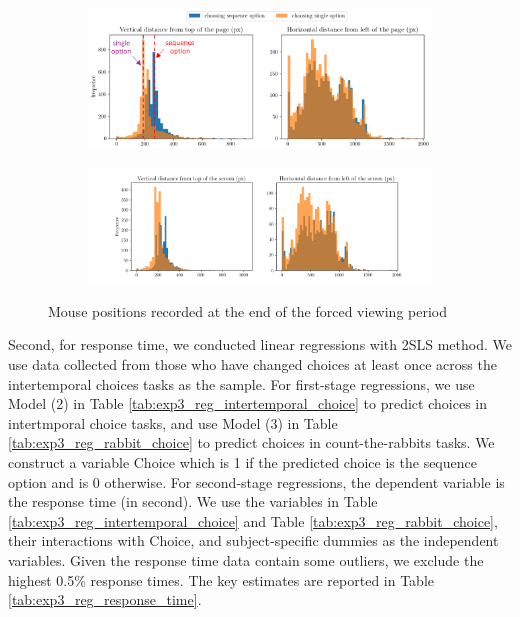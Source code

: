 \documentclass[
  12pt,
]{article}
\begin{document}
\begin{figure}
  \centering
  \begin{subfigure}{\textwidth}
    \centering
    \includegraphics[width=\linewidth]{figures/mouse_intertemporal.png}
  \end{subfigure}
  \begin{subfigure}{\textwidth}
    \vspace{1.5em}
    \centering
    \includegraphics[width=\linewidth]{figures/mouse_rabbit.png}
  \end{subfigure}
  \caption{Mouse positions recorded at the end of the forced viewing period}
  \label{fig:exp3_mouse_position}
\end{figure}

Second, for response time, we conducted linear regressions with 2SLS
method. We use data collected from those who have changed choices at
least once across the intertemporal choices tasks as the sample. For
first-stage regressions, we use Model (2) in Table
\ref{tab:exp3_reg_intertemporal_choice} to predict choices in
intertmporal choice tasks, and use Model (3) in Table
\ref{tab:exp3_reg_rabbit_choice} to predict choices in count-the-rabbits
tasks. We construct a variable Choice which is 1 if the predicted choice
is the sequence option and is 0 otherwise. For second-stage regressions,
the dependent variable is the response time (in second). We use the
variables in Table \ref{tab:exp3_reg_intertemporal_choice} and Table
\ref{tab:exp3_reg_rabbit_choice}, their interactions with Choice, and
subject-specific dummies as the independent variables. Given the
response time data contain some outliers, we exclude the highest 0.5\%
response times. The key estimates are reported in Table
\ref{tab:exp3_reg_response_time}.
\end{document}

